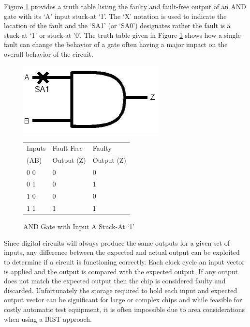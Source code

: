 \documentclass[12pt]{report}
\begin{document}
Figure \ref{fig:andtruth} provides a truth table listing the faulty and fault-free output of an AND gate with its `A' input stuck-at `1'.  The `X' notation is used to indicate the location of the fault and the `SA1' (or `SA0') designates rather the fault is a stuck-at `1' or stuck-at '0'\cite{stroud}.  The truth table given in Figure \ref{fig:andtruth} shows how a single fault can change the behavior of a gate often having a major impact on the overall behavior of the circuit.
\begin{figure}[b!]
	\begin{center}
	\begin{minipage}[l]{.45\textwidth}
		\includegraphics[scale=.7]{images/and-gate}
	\end{minipage}
	\begin{minipage}[r]{.45\textwidth}
		\begin{tabular}{|l|l|l|}
			\hline
			Inputs & Fault Free & Faulty \\
			(AB) & Output (Z) & Output (Z) \\ \hline
			0 0 & 0 & 0 \\ \hline
			0 1 & 0 & 1 \\ \hline
			1 0 & 0 & 0 \\ \hline
			1 1 & 1 & 1 \\ \hline
		\end{tabular}
	\end{minipage}
	\end{center}
	\caption{AND Gate with Input A Stuck-At `1'}
	\label{fig:andtruth}
\end{figure}
Since digital circuits will always produce the same outputs for a given set of inputs, any difference between the expected and actual output can be exploited to determine if a circuit is functioning correctly\cite{stroud}.  Each clock cycle an input vector is applied and the output is compared with the expected output.  If any output does not match the expected output then the chip is considered faulty and discarded.  Unfortunately the storage required to hold each input and expected output vector can be significant for large or complex chips and while feasible for costly automatic test equipment, it is often impossible due to area considerations when using a BIST approach\cite{faultdiagnosis}.
\end{document}
